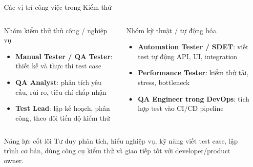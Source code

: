 \documentclass[aspectratio=169,12pt]{beamer}
\begin{document}
\begin{frame}[shrink=8]{Các vị trí công việc trong Kiểm thử}
  \begin{columns}[T,totalwidth=\textwidth]
    \begin{block}{Nhóm kiểm thử thủ công / nghiệp vụ}
      \begin{itemize}
        \item \textbf{Manual Tester / QA Tester}: thiết kế và thực thi test case
        \item \textbf{QA Analyst}: phân tích yêu cầu, rủi ro, tiêu chí chấp nhận
        \item \textbf{Test Lead}: lập kế hoạch, phân công, theo dõi tiến độ kiểm thử
      \end{itemize}
    \end{block}

    \begin{block}{Nhóm kỹ thuật / tự động hóa}
      \begin{itemize}
        \item \textbf{Automation Tester / SDET}: viết test tự động API, UI, integration
        \item \textbf{Performance Tester}: kiểm thử tải, stress, bottleneck
        \item \textbf{QA Engineer trong DevOps}: tích hợp test vào CI/CD pipeline
      \end{itemize}
    \end{block}
  \end{columns}

  \vspace{0.25em}
  \begin{alertblock}{Năng lực cốt lõi}
    Tư duy phân tích, hiểu nghiệp vụ, kỹ năng viết test case, lập trình cơ bản,
    dùng công cụ kiểm thử và giao tiếp tốt với developer/product owner.
  \end{alertblock}
\end{frame}
\end{document}
